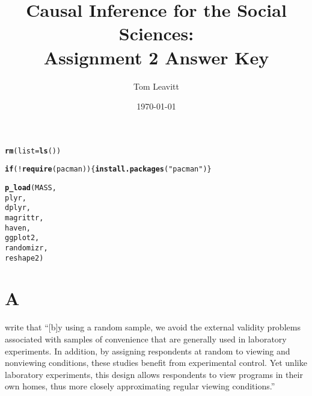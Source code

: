 \documentclass[11pt]{article}\usepackage[]{graphicx}\usepackage[]{color}
\makeatletter
\newcommand{\hlstr}[1]{\textcolor[rgb]{0.192,0.494,0.8}{#1}}%
\newcommand{\hlopt}[1]{\textcolor[rgb]{0,0,0}{#1}}%
\newcommand{\hlstd}[1]{\textcolor[rgb]{0.345,0.345,0.345}{#1}}%
\newcommand{\hlkwa}[1]{\textcolor[rgb]{0.161,0.373,0.58}{\textbf{#1}}}%
\newcommand{\hlkwc}[1]{\textcolor[rgb]{0.333,0.667,0.333}{#1}}%
\newcommand{\hlkwd}[1]{\textcolor[rgb]{0.737,0.353,0.396}{\textbf{#1}}}%
\newenvironment{kframe}{%
 \def\at@end@of@kframe{}%
 \ifinner\ifhmode%
  \def\at@end@of@kframe{\end{minipage}}%
  \begin{minipage}{\columnwidth}%
 \fi\fi%
 \def\FrameCommand##1{\hskip\@totalleftmargin \hskip-\fboxsep
 \colorbox{shadecolor}{##1}\hskip-\fboxsep
     \hskip-\linewidth \hskip-\@totalleftmargin \hskip\columnwidth}%
 \MakeFramed {\advance\hsize-\width
   \@totalleftmargin\z@ \linewidth\hsize
   \@setminipage}}%
 {\par\unskip\endMakeFramed%
 \at@end@of@kframe}
\newenvironment{knitrout}{}{} %
\theoremstyle{newstyle}
\makeatother
\begin{document}
\begin{titlepage}
\title{Causal Inference for the Social Sciences: \\
Assignment 2 Answer Key}
\author{Tom Leavitt}
\date{\today}
\maketitle

\end{titlepage}
\tableofcontents
\clearpage

\doublespacing

\maketitle

\begin{knitrout}
\color{fgcolor}\begin{kframe}
\begin{alltt}
\hlkwd{rm}\hlstd{(}\hlkwc{list}\hlstd{=}\hlkwd{ls}\hlstd{())}

\hlkwa{if}\hlstd{(}\hlopt{!}\hlkwd{require}\hlstd{(pacman)) \{} \hlkwd{install.packages}\hlstd{(}\hlstr{"pacman"}\hlstd{) \}}
\end{alltt}


{\ttfamily\noindent\itshape\color{messagecolor}{\#\# Loading required package: pacman}}

{\ttfamily\noindent\color{warningcolor}{\#\# Warning: package 'pacman' was built under R version 3.3.2}}\begin{alltt}
\hlkwd{p_load}\hlstd{(MASS,}
       \hlstd{plyr,}
       \hlstd{dplyr,}
       \hlstd{magrittr,}
       \hlstd{haven,}
       \hlstd{ggplot2,}
       \hlstd{randomizr,}
       \hlstd{reshape2)}
\end{alltt}
\end{kframe}
\end{knitrout}

\section{A}

\citet[276--277]{albertsonlawrence2009} write that ``[b]y using a random sample, we avoid the external validity problems associated with samples of convenience that are generally used in laboratory experiments. In addition, by assigning respondents at random to viewing and nonviewing conditions, these studies benefit from experimental control. Yet unlike laboratory experiments, this design allows respondents to view programs in their own homes, thus more closely approximating regular viewing conditions.''
\end{document}
